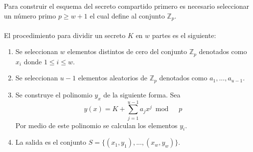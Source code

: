 Para construir el esquema del secreto compartido primero es necesario seleccionar un número primo $p \geq w+1$ el cual define al conjunto $\mathbb{Z}_p$.
\\
\\
El procedimiento para dividir un secreto $K$ en $w$ partes es el siguiente:

\begin{enumerate}
 \item Se seleccionan $w$ elementos distintos de cero del conjunto $\mathbb{Z}_p$ denotados como $x_i$ donde $1 \leq i \leq w$.
 \item Se seleccionan $u-1$ elementos aleatorios de $\mathbb{Z}_p$ denotados como $a_1,...,a_{u-1}$.
 \item Se construye el polinomio $y_x$ de la siguiente forma. Sea \begin{equation}
            y(x)=K+\sum_{j=1}^{u-1} a_j x^j \bmod \quad p
           \end{equation}
           Por medio de este polinomio se calculan los elementos $y_i$.
 \item La salida es el conjunto $S=\{(x_1,y_1),...,(x_w,y_w)\}$.
\end{enumerate}

